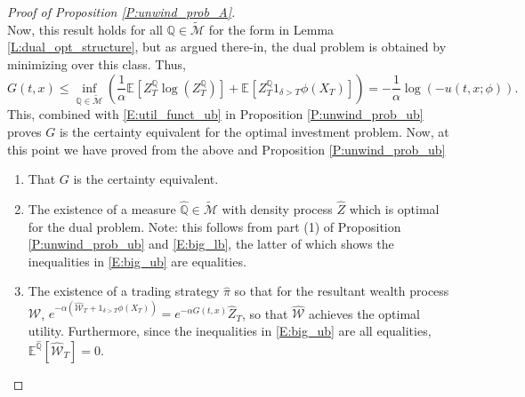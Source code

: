 \documentclass[11pt, letterpaper]{amsart}
\theoremstyle{definition}
\theoremstyle{remark}
\numberwithin{equation}{section}
\newcommand{\We}{\mathcal{W}}
\newcommand{\hwe}{\hat{\We}}
\newcommand{\hz}{\hat{Z}}
\newcommand{\hqprob}{\hat{\qprob}}
\newcommand{\hpi}{\hat{\pi}}
\newcommand{\qprob}{\mathbb{Q}}
\newcommand{\esp}{\mathbb{E}}
\newcommand{\espalt}[2]{\esp^{#1}\bra{#2}}
\newcommand{\tM}{\widetilde{\mathcal{M}}}
\newcommand{\bra}[1]{\left[#1\right]}
\begin{document}
\begin{proof}[Proof of Proposition \ref{P:unwind_prob_A}]
\begin{equation*}
\end{equation*}
Now, this result holds for all $\qprob\in\tM$ for the form in Lemma \ref{L:dual_opt_structure}, but as argued there-in, the dual problem is obtained by minimizing over this class.  Thus,
\begin{equation}\label{E:big_lb}
G(t,x) \leq \inf_{\qprob\in\tM}\left(\frac{1}{\alpha}\espalt{}{Z^{\qprob}_T\log\left(Z^\qprob_T\right)} +\espalt{}{Z^\qprob_T 1_{\delta > T}\phi(X_T)}\right) = -\frac{1}{\alpha}\log\left(-u(t,x;\phi)\right).
\end{equation}
This, combined with \eqref{E:util_funct_ub} in Proposition \ref{P:unwind_prob_ub} proves $G$ is the certainty equivalent for the optimal investment problem. Now, at this point we have proved from the above and Proposition \ref{P:unwind_prob_ub}
\begin{enumerate}[(1)]
\item That $G$ is the certainty equivalent.
\item The existence of a measure $\hqprob\in\tM$  with density process $\hz$ which is optimal for the dual problem.  Note: this follows from part (1) of Proposition \ref{P:unwind_prob_ub} and \eqref{E:big_lb}, the latter of which shows the inequalities in \eqref{E:big_ub} are equalities.
\item The existence of a trading strategy $\hpi$ so that for the resultant wealth process $\hwe$, $e^{-\alpha\left(\hwe_T + 1_{\delta > T}\phi(X_T)\right)} = e^{-\alpha G(t,x)}\hz_T$, so that $\hwe$ achieves the optimal utility.  Furthermore, since the inequalities in \eqref{E:big_ub} are all equalities, $\espalt{\hqprob}{\hwe_T} = 0$.
\end{enumerate}


\end{proof}
\end{document}
